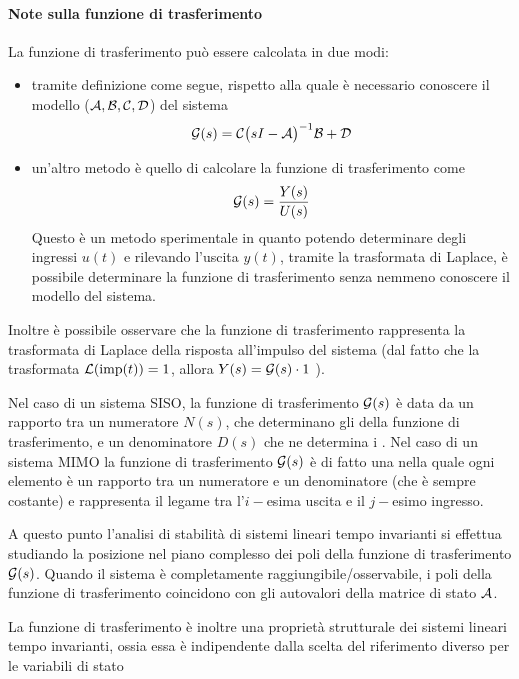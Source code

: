 	\paragraph{Note sulla funzione di trasferimento} La funzione di trasferimento può essere calcolata in due modi:
	\begin{itemize}
		\item tramite definizione come segue, rispetto alla quale è necessario conoscere il modello ($\mathcal A,\mathcal B,\mathcal C,\mathcal D$) del sistema
		\[ \mathcal G(s) =  \mathcal C \big(sI-\mathcal A\big)^{-1} \mathcal B + \mathcal D \]
		\item un'altro metodo è quello di calcolare la funzione di trasferimento come
		\[ \mathcal G(s) = \frac{Y(s)}{U(s)}\]
		Questo è un metodo sperimentale in quanto potendo determinare degli ingressi $u(t)$ e rilevando l'uscita $y(t)$, tramite la trasformata di Laplace, è possibile determinare la funzione di trasferimento senza nemmeno conoscere il modello del sistema.
	\end{itemize}
	
	Inoltre è possibile osservare che la funzione di trasferimento rappresenta la trasformata di Laplace della risposta all'impulso del sistema (dal fatto che la trasformata $\mathcal L(\textrm{imp}(t))=1$, allora $Y(s) = \mathcal G(s) \cdot 1$ ).
	
	Nel caso di un sistema SISO, la funzione di trasferimento $\mathcal G(s)$ è data da un rapporto tra un numeratore $N(s)$, che determinano gli  della funzione di trasferimento, e un denominatore $D(s)$ che ne determina i . Nel caso di un sistema MIMO la funzione di trasferimento $\mathcal G(s)$ è di fatto una  nella quale ogni elemento è un rapporto tra un numeratore e un denominatore (che è sempre costante) e rappresenta il legame tra l'$i-$esima uscita e il $j-$esimo ingresso.
	
	A questo punto l'analisi di stabilità di sistemi lineari tempo invarianti si effettua studiando la posizione nel piano complesso dei poli della funzione di trasferimento $\mathcal G(s)$. Quando il sistema è completamente raggiungibile/osservabile, i poli della funzione di trasferimento coincidono con gli autovalori della matrice di stato $\mathcal A$.
	
	La funzione di trasferimento è inoltre una proprietà strutturale dei sistemi lineari tempo invarianti, ossia essa è indipendente dalla scelta del riferimento diverso per le variabili di stato
	
